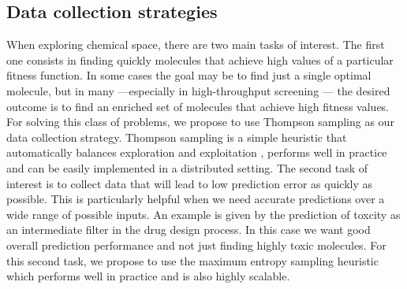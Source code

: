 \subsection{Data collection strategies}

When exploring chemical space, there are two main tasks of interest. The first one consists in finding quickly molecules that achieve high values of a particular fitness function. In some cases the goal may be to find just a single optimal molecule, but in many ---especially in high-throughput screening \cite{Pyzer_Knapp_2015a}--- the desired outcome is to find 
an enriched set of molecules that achieve high fitness values. 
For solving this class of problems, we propose to use Thompson sampling \cite{Thompson_1933} as our data collection strategy. Thompson sampling is a simple heuristic that automatically balances exploration and exploitation \cite{Chapelle2011}, performs well in practice and can be easily implemented in a distributed setting.
The second task of interest is to collect data that will lead to low prediction error as quickly as possible. This is particularly helpful when we need accurate predictions over a wide range of possible inputs. An example is given by the prediction of toxcity as an intermediate filter in the drug design process. In this case we want good overall prediction performance and not just finding highly toxic molecules. For this second task, we propose to use the maximum entropy sampling heuristic \cite{MacKay_1992} which performs well in practice and is also highly scalable.